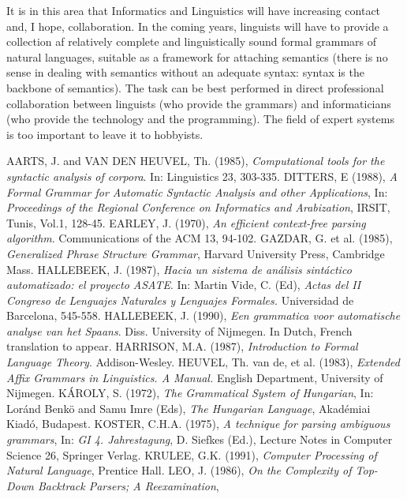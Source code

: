 It is in this area that Informatics and Linguistics will have
increasing contact and, I hope, collaboration. In the coming years,
linguists will have to provide a collection af relatively complete
and linguistically sound formal grammars of natural languages,
suitable as a framework for attaching semantics (there is
no sense in dealing with semantics without an adequate syntax:
syntax is the backbone of semantics). The task can be best
performed in direct professional collaboration between linguists (who provide
the grammars) and informaticians (who provide  the technology and
the programming). The field of expert systems is too important to
leave it to hobbyists.
\begin{thebibliography}{88}
AARTS, J. and VAN DEN HEUVEL, Th. (1985),
{\em Computational tools for the syntactic analysis of corpora}.
In: Linguistics 23, 303-335.
DITTERS, E (1988),
{\em A Formal Grammar for Automatic Syntactic Analysis and other Applications},
In: {\em Proceedings of the Regional Conference on Informatics and
Arabization}, IRSIT, Tunis, Vol.1, 128-45.
EARLEY, J. (1970),
{\em An efficient context-free parsing algorithm}.
Communications of the ACM 13, 94-102.
GAZDAR, G. et al. (1985),
{\em Generalized Phrase Structure Grammar},
Harvard University Press, Cambridge Mass.
HALLEBEEK, J. (1987),
{\em Hacia un sistema de an\'alisis sint\'actico automatizado:
el proyecto ASATE}.
In: Martin Vide, C. (Ed), {\em Actas del II Congreso de
Lenguajes Naturales y Lenguajes Formales.} Universidad de Barcelona,
545-558.
HALLEBEEK, J. (1990),
{\em Een grammatica voor automatische analyse van het Spaans}.
Diss. University of Nijmegen. In Dutch, French translation to appear.
HARRISON, M.A. (1987),
{\em Introduction to Formal Language Theory}.
Addison-Wesley.
HEUVEL, Th. van de, et al. (1983),
{\em Extended Affix Grammars in Linguistics. A Manual.}
English Department, University of Nijmegen.
K\'AROLY, S. (1972),
{\em The Grammatical System of Hungarian},
In: Lor\'and Benk\"o and Samu Imre (Eds),
{\em The Hungarian Language}, Akad\'emiai Kiad\'o, Budapest.
KOSTER, C.H.A. (1975),
{\em A technique for parsing ambiguous grammars},
In: {\em GI 4. Jahrestagung}, D. Siefkes (Ed.),
Lecture Notes in Computer Science 26, Springer Verlag.
KRULEE, G.K. (1991),
{\em Computer Processing of Natural Language},
Prentice Hall.
LEO, J. (1986),
{\em On the Complexity of Top-Down Backtrack Parsers; A Reexamination},

\end{thebibliography}
